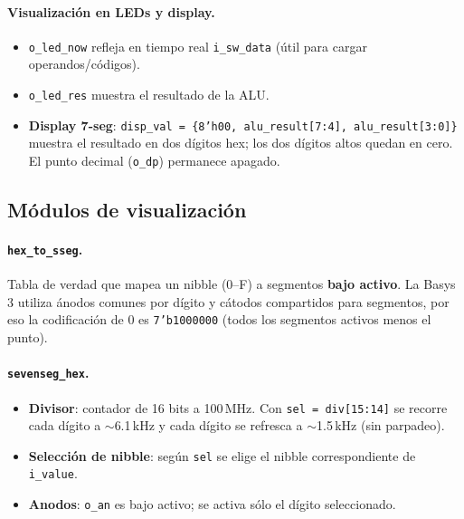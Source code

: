 \paragraph{Visualización en LEDs y display.}
\begin{itemize}
    \item \texttt{o\_led\_now} refleja en tiempo real \texttt{i\_sw\_data} (útil para cargar operandos/códigos).
    \item \texttt{o\_led\_res} muestra el resultado de la ALU.
    \item \textbf{Display 7-seg}: \texttt{disp\_val = \{8'h00, alu\_result[7:4], alu\_result[3:0]\}} muestra el resultado en dos dígitos hex; los dos dígitos altos quedan en cero. El punto decimal (\texttt{o\_dp}) permanece apagado.
\end{itemize}

\subsection{Módulos de visualización}
\paragraph{\texttt{hex\_to\_sseg}.}
Tabla de verdad que mapea un nibble (0--F) a segmentos \textbf{bajo activo}. La Basys 3 utiliza ánodos comunes por dígito y cátodos compartidos para segmentos, por eso la codificación de 0 es \texttt{7'b1000000} (todos los segmentos activos menos el punto).

\paragraph{\texttt{sevenseg\_hex}.}
\begin{itemize}
    \item \textbf{Divisor}: contador de 16 bits a 100\,MHz. Con \texttt{sel = div[15:14]} se recorre cada dígito a $\sim$6.1\,kHz y cada dígito se refresca a $\sim$1.5\,kHz (sin parpadeo).
    \item \textbf{Selección de nibble}: según \texttt{sel} se elige el nibble correspondiente de \texttt{i\_value}.
    \item \textbf{Anodos}: \texttt{o\_an} es bajo activo; se activa sólo el dígito seleccionado.
\end{itemize}